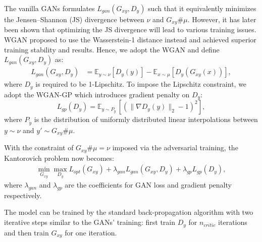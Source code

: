 \documentclass[runningheads]{llncs}
\newcommand{\mE}{\mathbb{E}}
\begin{document}
The vanilla GANs \cite{gan} formulates $L_{gan} (G_{xy},D_{y})$ such that it equivalently minimizes the Jensen–Shannon (JS) divergence between $\nu$ and $G_{xy}\#\mu$. However, it has later been shown that optimizing the JS divergence will lead to various training issues. WGAN \cite{wgan} proposed to use the Wasserstein-1 distance instead and achieved superior training stability and results. Hence, we adopt the WGAN and define $L_{gan} (G_{xy},D_{y})$ as: 
\begin{equation}
\begin{aligned}
L_{gan} (G_{xy},D_{y}) &={\mE}_{y \sim \nu}[D_{y}(y)] -{\mE}_{x \sim \mu}[D_{y}(G_{xy}(x))],
\end{aligned}
\end{equation}
where $D_{y}$ is required to be 1-Lipschitz. To impose the Lipschitz constraint, we adopt the WGAN-GP \cite{wgangp} which introduces gradient penalty on $D_{y}$:
\begin{equation}
L_{gp}(D_{y})= {\mE}_{y \sim P_{\tilde{y}}} \, [ (\lVert \nabla D_{y}(y) \rVert_2 -1)^2],
\end{equation}
where $P_{\tilde{y}}$ is the distribution of uniformly distributed linear interpolations between $y \sim \nu$ and $y' \sim G_{xy}\#\mu$.

With the constraint of $G_{xy}\#\mu=\nu$ imposed via the adversarial training, the Kantorovich problem now becomes:
\begin{equation}
\begin{aligned}
\min\limits_{G_{xy}} \max\limits_{D_{y}} L_{opt}(G_{xy}) + \lambda_{gan} L_{gan}(G_{xy},D_{y}) + \lambda_{gp} L_{gp}(D_{y}),
\end{aligned}
\end{equation}
where $\lambda_{gan}$ and $\lambda_{gp}$ are the coefficients for GAN loss and gradient penalty respectively. 

The model can be trained by the standard back-propagation algorithm with two iterative steps similar to the GANs' training: first train $D_y$ for $n_{critic}$ iterations and then train $G_{xy}$ for one iteration. 
\end{document}
